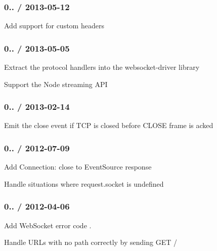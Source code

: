 \subsubsection*{0.. / 2013-\/05-\/12}


\begin{DoxyItemize}
\item Add support for custom headers
\end{DoxyItemize}

\subsubsection*{0.. / 2013-\/05-\/05}


\begin{DoxyItemize}
\item Extract the protocol handlers into the {\ttfamily websocket-\/driver} library
\item Support the Node streaming A\+PI
\end{DoxyItemize}

\subsubsection*{0.. / 2013-\/02-\/14}


\begin{DoxyItemize}
\item Emit the {\ttfamily close} event if T\+CP is closed before C\+L\+O\+SE frame is acked
\end{DoxyItemize}

\subsubsection*{0.. / 2012-\/07-\/09}


\begin{DoxyItemize}
\item Add {\ttfamily Connection\+: close} to Event\+Source response
\item Handle situations where {\ttfamily request.\+socket} is undefined
\end{DoxyItemize}

\subsubsection*{0.. / 2012-\/04-\/06}


\begin{DoxyItemize}
\item Add Web\+Socket error code {}.
\item Handle U\+R\+Ls with no path correctly by sending {\ttfamily G\+ET /}
\end{DoxyItemize}

